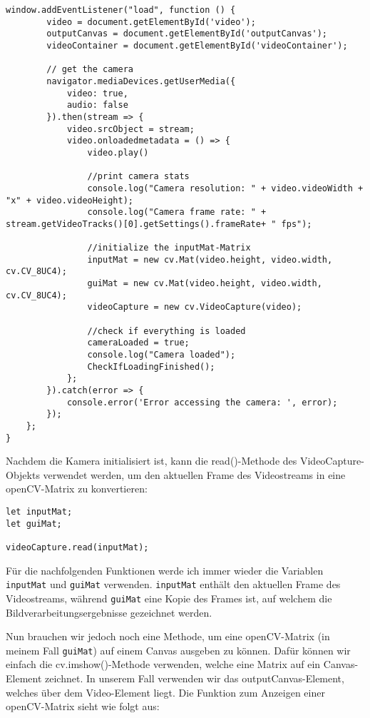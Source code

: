 \begin{lstlisting}[style=JavaScript]
    window.addEventListener("load", function () {
        video = document.getElementById('video');
        outputCanvas = document.getElementById('outputCanvas');
        videoContainer = document.getElementById('videoContainer');

        // get the camera
        navigator.mediaDevices.getUserMedia({
            video: true,
            audio: false
        }).then(stream => {
            video.srcObject = stream;
            video.onloadedmetadata = () => {
                video.play()

                //print camera stats
                console.log("Camera resolution: " + video.videoWidth + "x" + video.videoHeight);
                console.log("Camera frame rate: " + stream.getVideoTracks()[0].getSettings().frameRate+ " fps");

                //initialize the inputMat-Matrix
                inputMat = new cv.Mat(video.height, video.width, cv.CV_8UC4);
                guiMat = new cv.Mat(video.height, video.width, cv.CV_8UC4);
                videoCapture = new cv.VideoCapture(video);

                //check if everything is loaded
                cameraLoaded = true;
                console.log("Camera loaded");
                CheckIfLoadingFinished();
            };
        }).catch(error => {
            console.error('Error accessing the camera: ', error);
        });
    };
}
\end{lstlisting}

Nachdem die Kamera initialisiert ist, kann die read()-Methode des VideoCapture-Objekts verwendet werden, um den aktuellen Frame des Videostreams in eine openCV-Matrix zu konvertieren:

\begin{lstlisting}[style=JavaScript]
let inputMat;
let guiMat;

videoCapture.read(inputMat);
\end{lstlisting}

Für die nachfolgenden Funktionen werde ich immer wieder die Variablen \texttt{inputMat} und \texttt{guiMat} verwenden. \texttt{inputMat} enthält den aktuellen Frame des Videostreams, während \texttt{guiMat} eine Kopie des Frames ist, auf welchem die Bildverarbeitungsergebnisse gezeichnet werden. 

Nun brauchen wir jedoch noch eine Methode, um eine openCV-Matrix (in meinem Fall \texttt{guiMat}) auf einem Canvas ausgeben zu können. Dafür können wir einfach die cv.imshow()-Methode verwenden, welche eine Matrix auf ein Canvas-Element zeichnet. In unserem Fall verwenden wir das outputCanvas-Element, welches über dem Video-Element liegt. Die Funktion zum Anzeigen einer openCV-Matrix sieht wie folgt aus:

